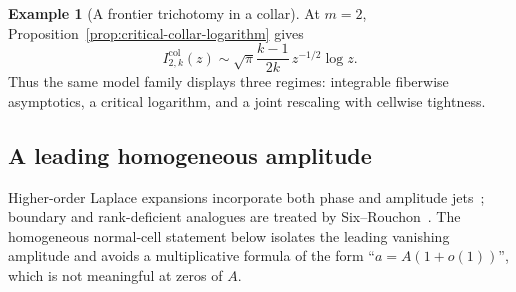 \documentclass[11pt]{amsart}
\numberwithin{equation}{section}
\theoremstyle{definition}
\newtheorem{example}[theorem]{Example}
\theoremstyle{remark}
\begin{document}
\begin{example}[A frontier trichotomy in a collar]
At $m=2$, Proposition~\ref{prop:critical-collar-logarithm} gives
\begin{equation}\label{eq:frontier-critical}
 I^{\mathrm{col}}_{2,k}(z)\sim
 \sqrt\pi\frac{k-1}{2k}\,z^{-1/2}\log z.
\end{equation}
Thus the same model family displays three regimes: integrable fiberwise
asymptotics, a critical logarithm, and a joint rescaling with cellwise tightness.
\end{example}

\subsection{A leading homogeneous amplitude}

Higher-order Laplace expansions incorporate both phase and amplitude
jets~\cite{Kirwin,FukudaKagayaUeda}; boundary and rank-deficient analogues are
treated by Six--Rouchon~\cite{SixRouchon}.  The homogeneous normal-cell statement
below isolates the leading vanishing amplitude and avoids a multiplicative
formula of the form ``$a=A(1+o(1))$'', which is not meaningful at zeros of $A$.
\end{document}
